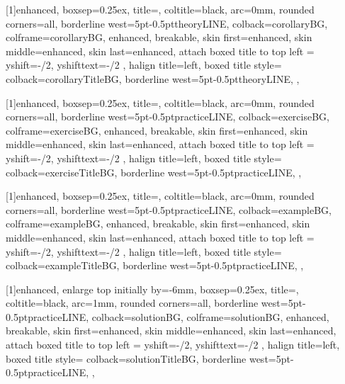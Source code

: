 [1]{enhanced,
    boxsep=0.25ex,
    title=,
    coltitle=black,
    arc=0mm,
    rounded corners=all,
    borderline west={5pt}{-0.5pt}{theoryLINE},
    colback=corollaryBG,
    colframe=corollaryBG,
    enhanced,
    breakable,
    skin first=enhanced,
    skin middle=enhanced,
    skin last=enhanced,
    attach boxed title to top left ={
        yshift=-\tcboxedtitleheight/2,
        yshifttext=-\tcboxedtitleheight/2
    },
    halign title=left,
    boxed title style={
        colback=corollaryTitleBG,
        borderline west={5pt}{-0.5pt}{theoryLINE},
    },
}

[1]{enhanced,
    boxsep=0.25ex,
    title=,
    coltitle=black,
    arc=0mm,
    rounded corners=all,
    borderline west={5pt}{-0.5pt}{practiceLINE},
    colback=exerciseBG,
    colframe=exerciseBG,
    enhanced,
    breakable,
    skin first=enhanced,
    skin middle=enhanced,
    skin last=enhanced,
    attach boxed title to top left ={
        yshift=-\tcboxedtitleheight/2,
        yshifttext=-\tcboxedtitleheight/2
    },
    halign title=left,
    boxed title style={
        colback=exerciseTitleBG,
        borderline west={5pt}{-0.5pt}{practiceLINE},
    },
}

[1]{enhanced,
    boxsep=0.25ex,
    title=,
    coltitle=black,
    arc=0mm,
    rounded corners=all,
    borderline west={5pt}{-0.5pt}{practiceLINE},
    colback=exampleBG,
    colframe=exampleBG,
    enhanced,
    breakable,
    skin first=enhanced,
    skin middle=enhanced,
    skin last=enhanced,
    attach boxed title to top left ={
        yshift=-\tcboxedtitleheight/2,
        yshifttext=-\tcboxedtitleheight/2
    },
    halign title=left,
    boxed title style={
        colback=exampleTitleBG,
        borderline west={5pt}{-0.5pt}{practiceLINE},
    },
}

[1]{enhanced,
    enlarge top initially by=-6mm,
    boxsep=0.25ex,
    title=,
    coltitle=black,
    arc=1mm,
    rounded corners=all,
    borderline west={5pt}{-0.5pt}{practiceLINE},
    colback=solutionBG,
    colframe=solutionBG,
    enhanced,
    breakable,
    skin first=enhanced,
    skin middle=enhanced,
    skin last=enhanced,
    attach boxed title to top left ={
        yshift=-\tcboxedtitleheight/2,
        yshifttext=-\tcboxedtitleheight/2
    },
    halign title=left,
    boxed title style={
        colback=solutionTitleBG,
        borderline west={5pt}{-0.5pt}{practiceLINE},
    },
}

